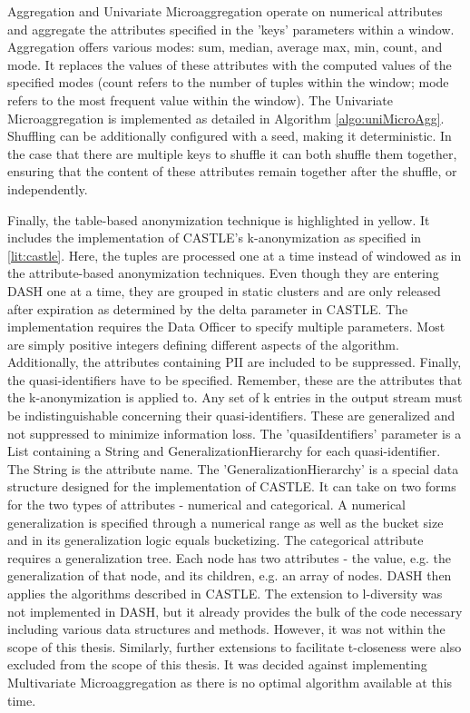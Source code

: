 Aggregation and Univariate Microaggregation operate on numerical attributes and aggregate the attributes specified in the 'keys' parameters within a window. Aggregation offers various modes: sum, median, average max, min, count, and mode. It replaces the values of these attributes with the computed values of the specified modes (count refers to the number of tuples within the window; mode refers to the most frequent value within the window). The Univariate Microaggregation is implemented as detailed in Algorithm \ref{algo:uniMicroAgg}. Shuffling can be additionally configured with a seed, making it deterministic. In the case that there are multiple keys to shuffle it can both shuffle them together, ensuring that the content of these attributes remain together after the shuffle, or independently. \par
Finally, the table-based anonymization technique is highlighted in yellow. It includes the implementation of CASTLE's k-anonymization as specified in \ref{lit:castle}. Here, the tuples are processed one at a time instead of windowed as in the attribute-based anonymization techniques. Even though they are entering \ac{DASH} one at a time, they are grouped in static clusters and are only released after expiration as determined by the delta parameter in CASTLE. The implementation requires the Data Officer to specify multiple parameters. Most are simply positive integers defining different aspects of the algorithm. Additionally, the attributes containing \ac{PII} are included to be suppressed. Finally, the quasi-identifiers have to be specified. Remember, these are the attributes that the k-anonymization is applied to. Any set of k entries in the output stream must be indistinguishable concerning their quasi-identifiers. These are generalized and not suppressed to minimize information loss. The 'quasiIdentifiers' parameter is a List containing a String and GeneralizationHierarchy for each quasi-identifier. The String is the attribute name. The 'GeneralizationHierarchy' is a special data structure designed for the implementation of CASTLE. It can take on two forms for the two types of attributes - numerical and categorical. A numerical generalization is specified through a numerical range as well as the bucket size and in its generalization logic equals bucketizing. The categorical attribute requires a generalization tree. Each node has two attributes - the value, e.g. the generalization of that node, and its children, e.g. an array of nodes. \ac{DASH} then applies the algorithms described in CASTLE. The extension to l-diversity was not implemented in \ac{DASH}, but it already provides the bulk of the code necessary including various data structures and methods. However, it was not within the scope of this thesis. Similarly, further extensions to facilitate t-closeness were also excluded from the scope of this thesis. It was decided against implementing Multivariate Microaggregation as there is no optimal algorithm available at this time. 


